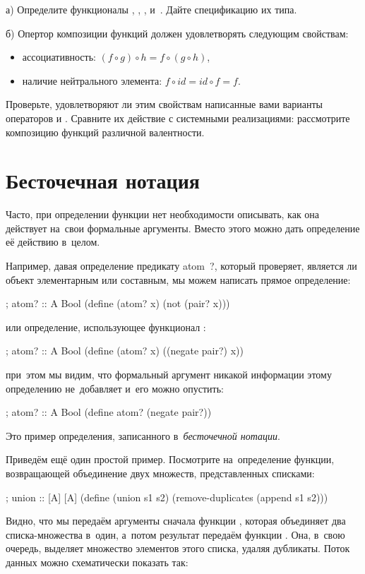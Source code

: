 \begin{Assignment}
а) Определите функционалы , , ,  и~. Дайте спецификацию их типа.

б) Опертор композиции функций должен удовлетворять следующим свойствам:
\begin{itemize}
  \item ассоциативность: $(f \circ g) \circ h = f \circ (g \circ h)$,
  \item наличие нейтрального элемента: $f \circ id = id \circ f = f$.
\end{itemize}
Проверьте, удовлетворяют ли этим свойствам написанные вами варианты операторов  и . Сравните их действие с системными реализациями: рассмотрите  композицию функций различной валентности.
\end{Assignment}

\section[2]{Бесточечная нотация}\label{tacit}%
Часто, при определении функции нет необходимости описывать, как она действует на~свои формальные аргументы. Вместо этого можно дать определение её действию в~целом.

Например, давая определение предикату \si{atom?}, который проверяет, является ли объект элементарным или составным, мы можем написать прямое определение:

\begin{Definition}[emph=x]
; atom? :: A \arrow Bool
(define (atom? x) (not (pair? x)))
\end{Definition}
\noindent или определение, использующее функционал :
\begin{Definition}[emph=x]
; atom? :: A \arrow Bool
(define (atom? x) ((negate pair?) x))
\end{Definition}
\noindent при~этом мы видим, что формальный аргумент  никакой информации этому определению не~добавляет и~его можно опустить:
\begin{Definition}
; atom? :: A \arrow Bool
(define atom? (negate pair?))
\end{Definition}
\noindent Это пример определения, записанного в~\emph{бесточечной нотации}.

\label{union}Приведём ещё один простой пример. Посмотрите на~определение функции, возвращающей объединение двух множеств, представленных списками:
\begin{Definition}[emph={s1,s2}]
; union :: [A] [A] \arrow [A]
(define (union s1 s2)
  (remove-duplicates (append s1 s2)))
\end{Definition}
\noindent Видно, что мы передаём аргументы сначала функции , которая объединяет два списка-множества в~один, а~потом результат передаём функции . Она, в~свою очередь, выделяет множество элементов этого списка, удаляя дубликаты. Поток данных можно схематически показать так:
\begin{center}
\end{center}

